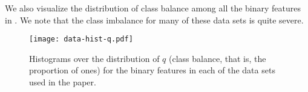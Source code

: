 We also visualize the distribution of class balance among all the binary features in
. We note that the class imbalance for many of these data sets is
quite severe.

\begin{figure}[htpb]
  \centering
  \texttt{[image: data-hist-q.pdf]}
  \caption{%
    Histograms over the distribution of \(q\) (class balance, that is, the
    proportion of ones) for the binary features in each of the data sets
    used in the paper.
  }
  \label{fig:data-hist-q}
\end{figure}


